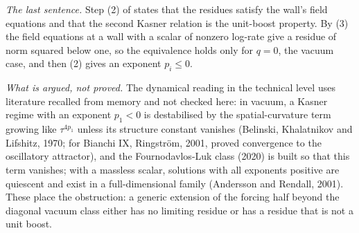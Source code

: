 \emph{The last sentence.} Step (2) of  states that the residues satisfy the wall's field equations and that the second Kasner relation is the unit-boost property. By (3) the field equations at a wall with a scalar of nonzero log-rate give a residue of norm squared below one, so the equivalence holds only for $q = 0$, the vacuum case, and then (2) gives an exponent $p_i \leq 0$.

\emph{What is argued, not proved.} The dynamical reading in the technical level uses literature recalled from memory and not checked here: in vacuum, a Kasner regime with an exponent $p_1 < 0$ is destabilised by the spatial-curvature term growing like $\tau^{4p_1}$ unless its structure constant vanishes (Belinski, Khalatnikov and Lifshitz, 1970; for Bianchi IX, Ringström, 2001, proved convergence to the oscillatory attractor), and the Fournodavlos-Luk class (2020) is built so that this term vanishes; with a massless scalar, solutions with all exponents positive are quiescent and exist in a full-dimensional family (Andersson and Rendall, 2001). These place the obstruction: a generic extension of the forcing half beyond the diagonal vacuum class either has no limiting residue or has a residue that is not a unit boost.
